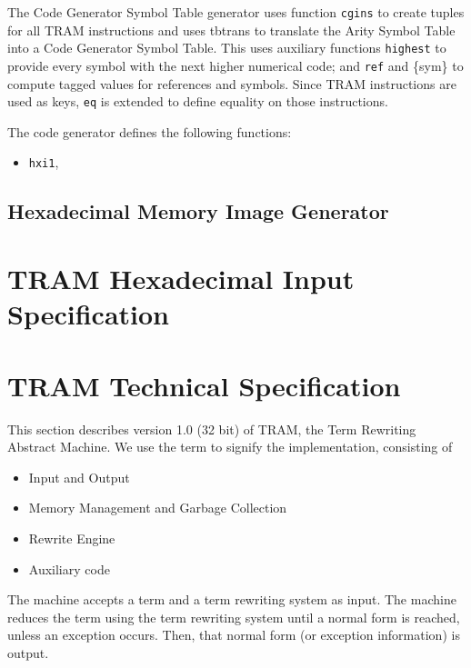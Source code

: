\documentclass[11pt,twoside]{memoir}
\newcommand{\D}[1]{\index{#1}\defn{#1}}
\def\T{\texttt}
\begin{document}
The Code Generator Symbol Table generator uses function \T{cgins} to create tuples for all TRAM instructions and uses tbtrans to translate the Arity Symbol Table into a Code Generator Symbol Table. This uses auxiliary functions \T{highest} to provide every symbol with the next higher numerical code; and \T{ref} and \{sym\} to compute tagged values for references and symbols. Since TRAM instructions are used as keys, \T{eq} is extended to define equality on those instructions.


\noindent
The code generator defines the following functions:
\begin{itemize}
	\item \T{hxi1}, 
\end{itemize}



\section{Hexadecimal Memory Image Generator}


\chapter{TRAM Hexadecimal Input Specification}
\label{apx:this}

\chapter{TRAM Technical Specification}
\label{apx:tts}

This section describes version 1.0 (32 bit) of TRAM, the Term Rewriting Abstract Machine. We use the term \D{machine} to signify the implementation, consisting of 
\begin{itemize}
	\item Input and Output 
	\item Memory Management and Garbage Collection
	\item Rewrite Engine
	\item Auxiliary code
\end{itemize}

The machine accepts a term and a term rewriting system as input. The machine reduces the term using the term rewriting system until a normal form is reached, unless an exception occurs. Then, that normal form (or exception information) is output.
\end{document}
